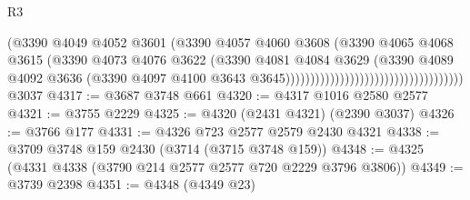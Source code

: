 \begin{lexlean}{R3}
\begin{coremodule}
                                                              (@3390
                                                                @4049
                                                                @4052
                                                                @3601
                                                                (@3390
                                                                  @4057
                                                                  @4060
                                                                  @3608
                                                                  (@3390
                                                                    @4065
                                                                    @4068
                                                                    @3615
                                                                    (@3390
                                                                      @4073
                                                                      @4076
                                                                      @3622
                                                                      (@3390
                                                                        @4081
                                                                        @4084
                                                                        @3629
                                                                        (@3390
                                                                          @4089
                                                                          @4092
                                                                          @3636
                                                                          (@3390
                                                                            @4097
                                                                            @4100
                                                                            @3643
                                                                            @3645))))))))))))))))))))))))))))))))))))
    @3037
@4317 := @3687 @3748 @661
@4320 := @4317 @1016 @2580 @2577
@4321 := @3755 @2229
@4325 := @4320 (@2431 @4321) (@2390 @3037)
@4326 := @3766 @177
@4331 := @4326 @723 @2577 @2579 @2430 @4321
@4338 := @3709 @3748 @159 @2430 (@3714 (@3715 @3748 @159))
@4348 := @4325 (@4331 @4338 (@3790 @214 @2577 @2577 @720 @2229 @3796 @3806))
@4349 := @3739 @2398
@4351 := @4348 (@4349 @23)

\end{coremodule}
\end{lexlean}
